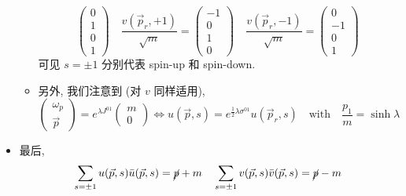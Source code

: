 \begin{itemize}
\begin{itemize}
\begin{equation}
\begin{pmatrix}
				0 \\
				1 \\
				0 \\
				1
			\end{pmatrix} \quad \frac{v(\vec{p}_r, + 1)}{\sqrt{m}} = \begin{pmatrix}
				- 1 \\
				0 \\
				1 \\
				0
			\end{pmatrix} \quad \frac{v(\vec{p}_r, - 1)}{\sqrt{m}} = \begin{pmatrix}
				0 \\
				- 1 \\
				0 \\
				1
			\end{pmatrix}
		\end{equation}
		可见 $s = \pm 1$ 分别代表 spin-up 和 spin-down.
		
		\item 另外, 我们注意到 (对 $v$ 同样适用),
		\begin{equation}
			\begin{pmatrix}
				\omega_p \\
				\vec{p}
			\end{pmatrix} = e^{\lambda J^{0 1}} \begin{pmatrix}
				m \\
				0
			\end{pmatrix} \iff u(\vec{p}, s) = e^{\frac{1}{2} \lambda \sigma^{0 1}} u(\vec{p}_r, s) \quad \text{with} \quad \frac{p_1}{m} = \sinh \lambda
		\end{equation}
	\end{itemize}
	
	\item 最后,
	\begin{equation}
		\sum_{s = \pm 1} u(\vec{p}, s) \bar{u}(\vec{p}, s) = \cancel{p} + m \quad \sum_{s = \pm 1} v(\vec{p}, s) \bar{v}(\vec{p}, s) = \cancel{p} - m
	\end{equation}
	

\end{itemize}
